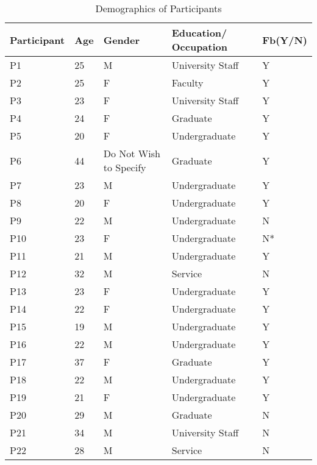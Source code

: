 \begin{table}[htb!]
\centering
\begin{tabular}{ |p{1.4cm}||p{0.5cm}|p{1.5cm}|p{2cm}|p{1cm}|}
 \hline
 Participant & Age & Gender & Education/ Occupation&Fb(Y/N) \\
 \hline \hline
 P1&25&M&University Staff&Y\\ 
 P2&25&F&Faculty&Y\\ 
 P3&23&F&University Staff&Y\\ 
 P4&24&F&Graduate&Y\\ 
 P5&20&F&Undergraduate&Y\\ 
 P6&44&Do Not Wish to Specify&Graduate&Y\\ 
 P7&23&M&Undergraduate&Y\\ 
 P8&20&F&Undergraduate&Y\\ 
 P9&22&M&Undergraduate&N\\
 P10&23&F&Undergraduate&N*\\
 P11&21&M&Undergraduate&Y\\ 
 P12&32&M&Service&N\\ 
 P13&23&F&Undergraduate&Y\\ 
 P14&22&F&Undergraduate&Y\\ 
 P15&19&M&Undergraduate&Y\\ 
 P16&22&M&Undergraduate&Y\\
 P17&37&F&Graduate&Y\\
 P18&22&M&Undergraduate&Y\\
 P19&21&F&Undergraduate&Y\\
 P20&29&M&Graduate&N\\
 P21&34&M&University Staff&N\\
 P22&28&M&Service&N\\
 \hline
\end{tabular} 
\caption{Demographics of Participants}
 \label{table:demo}
\end{table}
